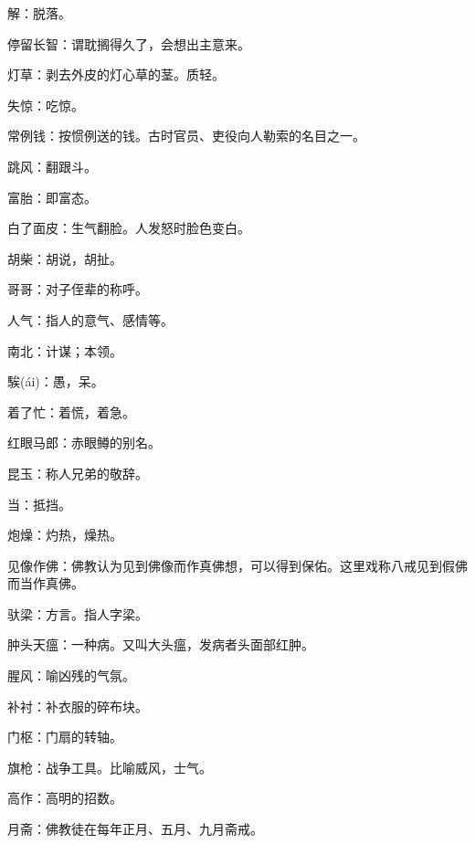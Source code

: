 \startbuffer[1387]
解：脱落。
\stopbuffer


\startbuffer[1388]
停留长智：谓耽搁得久了，会想出主意来。
\stopbuffer


\startbuffer[1389]
灯草：剥去外皮的灯心草的茎。质轻。
\stopbuffer


\startbuffer[1390]
失惊：吃惊。
\stopbuffer


\startbuffer[1391]
常例钱：按惯例送的钱。古时官员、吏役向人勒索的名目之一。
\stopbuffer


\startbuffer[1392]
跳风：翻跟斗。
\stopbuffer


\startbuffer[1393]
富胎：即富态。
\stopbuffer


\startbuffer[1394]
白了面皮：生气翻脸。人发怒时脸色变白。
\stopbuffer


\startbuffer[1395]
胡柴：胡说，胡扯。
\stopbuffer


\startbuffer[1396]
哥哥：对子侄辈的称呼。
\stopbuffer


\startbuffer[1397]
人气：指人的意气、感情等。
\stopbuffer


\startbuffer[1398]
南北：计谋；本领。
\stopbuffer


\startbuffer[1399]
騃(ái)：愚，呆。
\stopbuffer


\startbuffer[1400]
着了忙：着慌，着急。
\stopbuffer


\startbuffer[1401]
红眼马郎：赤眼鳟的别名。
\stopbuffer


\startbuffer[1402]
昆玉：称人兄弟的敬辞。
\stopbuffer


\startbuffer[1403]
当：抵挡。
\stopbuffer


\startbuffer[1404]
炮燥：灼热，燥热。
\stopbuffer


\startbuffer[1405]
见像作佛：佛教认为见到佛像而作真佛想，可以得到保佑。这里戏称八戒见到假佛而当作真佛。
\stopbuffer


\startbuffer[1406]
驮梁：方言。指人字梁。
\stopbuffer


\startbuffer[1407]
肿头天瘟：一种病。又叫大头瘟，发病者头面部红肿。
\stopbuffer


\startbuffer[1408]
腥风：喻凶残的气氛。
\stopbuffer


\startbuffer[1409]
补衬：补衣服的碎布块。
\stopbuffer


\startbuffer[1410]
门枢：门扇的转轴。
\stopbuffer


\startbuffer[1411]
旗枪：战争工具。比喻威风，士气。
\stopbuffer


\startbuffer[1412]
高作：高明的招数。
\stopbuffer


\startbuffer[1413]
月斋：佛教徒在每年正月、五月、九月斋戒。
\stopbuffer



